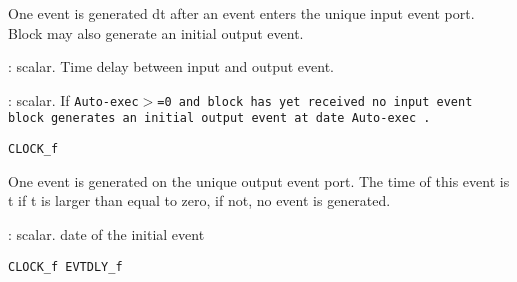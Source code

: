 %
%


\label{EVTDLYf}

One event is generated dt after an event enters the unique input
event port. Block may also generate an initial output event.
\begin{scitem}
\item[{\verb?Delay?}]
: scalar. Time delay between input and output event.
\item[{\verb?Auto-exec?}]
:  scalar. If %
\tt Auto-exec$>$=0 %
\rm and block has yet received  no input event
block generates an initial output event at date %
\tt Auto-exec%
\rm .
\end{scitem}%
{\verb?CLOCK_f?} \pageref{CLOCKf}







%
%


\label{EVTGENf}

One event is generated on the unique output event port. The time
of this event is t if t is larger than equal to zero, if not, no
event is generated.

\begin{scitem}
\item[{\verb?Event time?}]
: scalar. date of the initial event
\end{scitem}%
{\verb?CLOCK_f EVTDLY_f?} \pageref{CLOCKfEVTDLYf}







%
%


\label{EVTSCOPEf}

